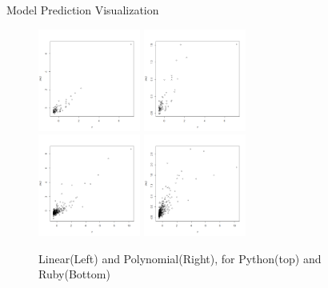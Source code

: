 \documentclass[presentation]{beamer}
\begin{document}
\begin{frame}{Model Prediction Visualization}
  \begin{figure}[ht]
    \scriptsize
    \centering
    \includegraphics[width=0.3\textwidth]{images/langpng/python-linear.png}
    \includegraphics[width=0.3\textwidth]{images/langpng/python-radial.png}\\
    \includegraphics[width=0.3\textwidth]{images/langpng/ruby-linear.png}
    \includegraphics[width=0.3\textwidth]{images/langpng/ruby-radial.png}\\
    \caption{Linear(Left) and Polynomial(Right), for Python(top) and Ruby(Bottom)}
  \end{figure}
\end{frame}
\end{document}

